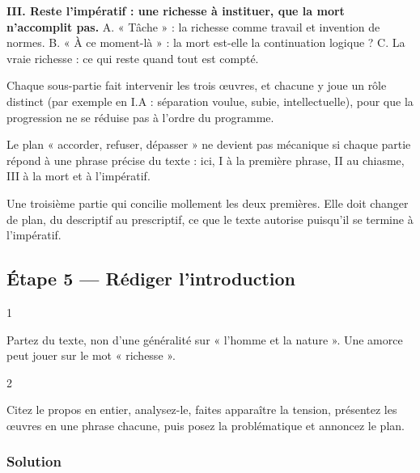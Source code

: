 \documentclass[11pt,a4paper]{article}
\begin{document}
\textbf{III. Reste l'impératif : une richesse à instituer, que la mort n'accomplit pas.}
A. « Tâche » : la richesse comme travail et invention de normes. B. « À ce moment-là » : la mort est-elle la continuation logique ? C. La vraie richesse : ce qui reste quand tout est compté.

Chaque sous-partie fait intervenir les trois œuvres, et chacune y joue un rôle distinct (par exemple en I.A : séparation voulue, subie, intellectuelle), pour que la progression ne se réduise pas à l'ordre du programme.

\begin{methode}

Le plan « accorder, refuser, dépasser » ne devient pas mécanique si chaque partie répond à une phrase précise du texte : ici, I à la première phrase, II au chiasme, III à la mort et à l'impératif.

\end{methode}

\begin{piege}

Une troisième partie qui concilie mollement les deux premières. Elle doit changer de plan, du descriptif au prescriptif, ce que le texte autorise puisqu'il se termine à l'impératif.

\end{piege}

\hypertarget{uxe9tape-5-ruxe9diger-lintroduction}{%
\subsection{Étape 5 --- Rédiger l'introduction}\label{uxe9tape-5-ruxe9diger-lintroduction}}

\begin{indication}{1}

Partez du texte, non d'une généralité sur « l'homme et la nature ». Une amorce peut jouer sur le mot « richesse ».

\end{indication}

\begin{indication}{2}

Citez le propos en entier, analysez-le, faites apparaître la tension, présentez les œuvres en une phrase chacune, puis posez la problématique et annoncez le plan.

\end{indication}

\hypertarget{solution-4}{%
\subsubsection{Solution}\label{solution-4}}
\end{document}
